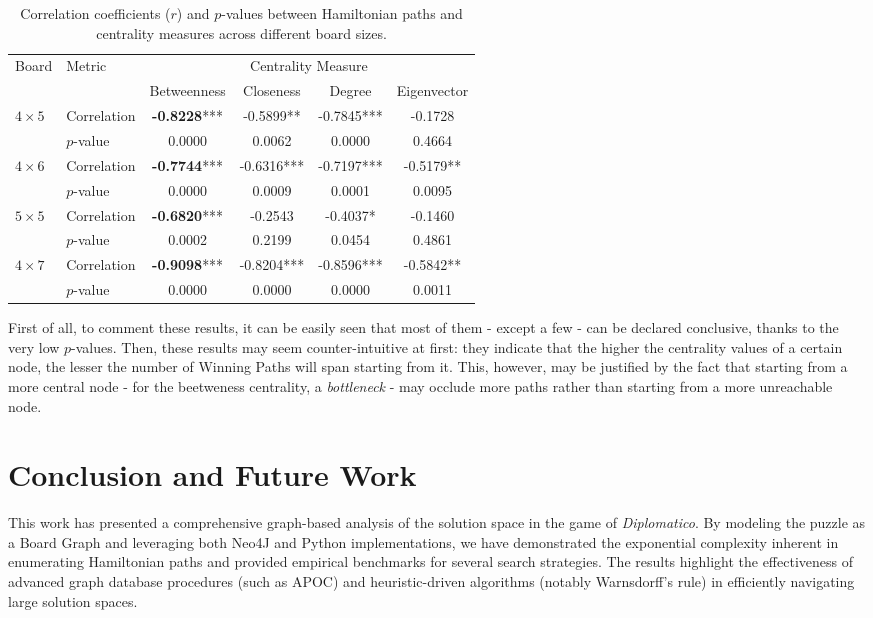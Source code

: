 \documentclass[conference]{IEEEtran}
\begin{document}
\begin{table}[ht]
	\centering
	\setlength{\tabcolsep}{4pt}
	\begin{tabular}{|llcccc|}
		\toprule
		\multirow{2}{*}{Board} & \multirow{2}{*}{Metric} & \multicolumn{4}{c}{Centrality Measure} \\
		\cmidrule(lr){3-6}
		& & Betweenness & Closeness & Degree & Eigenvector \\
		\midrule
		\multirow{2}{*}{$4 \times 5$} 
		& Correlation & \textbf{-0.8228}*** & -0.5899** & -0.7845*** & -0.1728 \\
		& $p$-value   & 0.0000 & 0.0062 & 0.0000 & 0.4664 \\
		\midrule
		\multirow{2}{*}{$4 \times 6$} 
		& Correlation & \textbf{-0.7744}*** & -0.6316*** & -0.7197*** & -0.5179** \\
		& $p$-value   & 0.0000 & 0.0009 & 0.0001 & 0.0095 \\
		\midrule
		\multirow{2}{*}{$5 \times 5$} 
		& Correlation & \textbf{-0.6820}*** & -0.2543 & -0.4037* & -0.1460 \\
		& $p$-value   & 0.0002 & 0.2199 & 0.0454 & 0.4861 \\
		\midrule
		\multirow{2}{*}{$4 \times 7$} 
		& Correlation & \textbf{-0.9098}*** & -0.8204*** & -0.8596*** & -0.5842** \\
		& $p$-value   & 0.0000 & 0.0000 & 0.0000 & 0.0011 \\
		\bottomrule
	\end{tabular}
	\caption{Correlation coefficients ($r$) and $p$-values between Hamiltonian paths and centrality measures across different board sizes.}
	\label{tab:correlations}
\end{table}

First of all, to comment these results, it can be easily seen that most of them - except a few - can be declared conclusive, thanks to the very low $p$-values.
Then, these results may seem counter-intuitive at first: they indicate that the higher the centrality values of a certain node, the lesser the number of Winning Paths will span starting from it. This, however, may be justified by the fact that starting from a more central node - for the beetweness centrality, a \textit{bottleneck} - may occlude more paths rather than starting from a more unreachable node.

\section{Conclusion and Future Work}
This work has presented a comprehensive graph-based analysis of the solution space in the game of \textit{Diplomatico}. By modeling the puzzle as a Board Graph and leveraging both Neo4J and Python implementations, we have demonstrated the exponential complexity inherent in enumerating Hamiltonian paths and provided empirical benchmarks for several search strategies. The results highlight the effectiveness of advanced graph database procedures (such as APOC) and heuristic-driven algorithms (notably Warnsdorff's rule) in efficiently navigating large solution spaces. 
\end{document}
